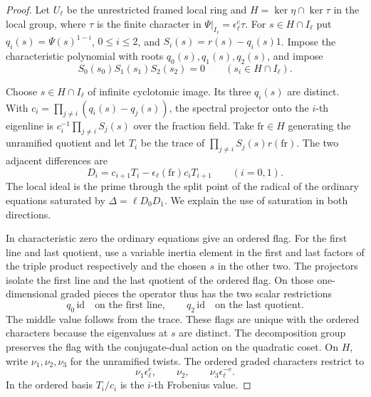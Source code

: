 \begin{proof}
Let \(U_\ell\) be the unrestricted framed
local ring and \(H=\ker\eta\cap\ker\tau\) in
the local group, where \(\tau\) is the finite
character in \(\Psi|_{I_\ell}=\epsilon_\ell^e\tau\).
For \(s\in H\cap I_\ell\) put \(q_i(s)=\Psi(s)^{1-i}\),
\(0\le i\le2\), and \(S_i(s)=r(s)-q_i(s)1\).
Impose the characteristic polynomial with roots
\(q_0(s),q_1(s),q_2(s)\), and impose
\[
          S_0(s_0)S_1(s_1)S_2(s_2)=0
          \qquad(s_i\in H\cap I_\ell).
\]

Choose \(s\in H\cap I_\ell\) of infinite
cyclotomic image. Its three \(q_i(s)\) are
distinct. With \(c_i=\prod_{j\ne i}(q_i(s)-q_j(s))\),
the spectral projector onto the \(i\)-th
eigenline is \(c_i^{-1}\prod_{j\ne i}S_j(s)\)
over the fraction field. Take \(\mathrm{fr}\in H\)
generating the unramified quotient and let
\(T_i\) be the trace of
\(\prod_{j\ne i}S_j(s)r(\mathrm{fr})\).
The two adjacent differences are
\[
       D_i=c_{i+1}T_i-
            \epsilon_\ell(\mathrm{fr})c_iT_{i+1}
       \qquad(i=0,1).
\]
The local ideal is the prime through the split
point of the radical of the ordinary equations
saturated by \(\Delta=\ell D_0D_1\).
We explain the use of saturation in both directions.

In characteristic zero the ordinary equations give
an ordered flag. For the first line and last
quotient, use a variable inertia element in
the first and last factors of the triple product
respectively and the chosen \(s\) in the other two.
The projectors isolate the first line and the last quotient of the ordered flag. On those one-dimensional graded pieces the operator thus has the two scalar restrictions
\[
 q_0\,\mathrm{id}\quad\text{on the first line},\qquad q_2\,\mathrm{id}\quad\text{on the last quotient}.
\] The middle value follows from the trace.
These flags are unique with the ordered characters
because the eigenvalues at \(s\) are distinct.
The decomposition group preserves the flag with
the conjugate-dual action on the quadratic coset.
On \(H\), write \(\nu_1,\nu_2,\nu_3\) for the unramified twists. The ordered graded characters restrict to
\[
 \nu_1\epsilon_\ell^e,\qquad\nu_2,\qquad\nu_3\epsilon_\ell^{-e}.
\]
In the ordered basis \(T_i/c_i\) is the \(i\)-th
Frobenius value.


\end{proof}
